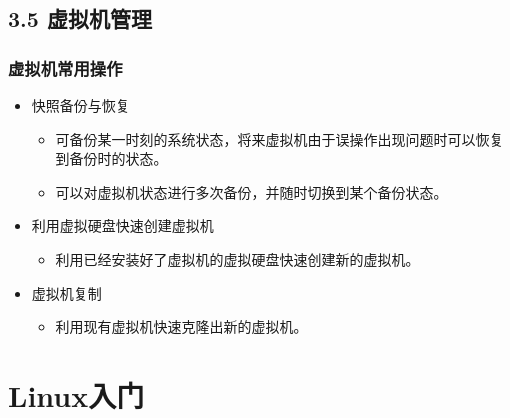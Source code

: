 \documentclass[xcolor=svgnames,bigger,presentation]{beamer}
\begin{document}
\subsection{3.5 虚拟机管理}
\label{sec-3-5}
\begin{frame}
\frametitle{虚拟机常用操作}
\label{sec-3-5-1}
\begin{itemize}

\item 快照备份与恢复
\label{sec-3-5-1-1}%
\begin{itemize}

\item 可备份某一时刻的系统状态，将来虚拟机由于误操作出现问题时可以恢复到备份时的状态。
\label{sec-3-5-1-1-1}%

\item 可以对虚拟机状态进行多次备份，并随时切换到某个备份状态。
\label{sec-3-5-1-1-2}%
\end{itemize} %

\item 利用虚拟硬盘快速创建虚拟机
\label{sec-3-5-1-2}%
\begin{itemize}

\item 利用已经安装好了虚拟机的虚拟硬盘快速创建新的虚拟机。
\label{sec-3-5-1-2-1}%
\end{itemize} %

\item 虚拟机复制
\label{sec-3-5-1-3}%
\begin{itemize}

\item 利用现有虚拟机快速克隆出新的虚拟机。
\label{sec-3-5-1-3-1}%
\end{itemize} %
\end{itemize} %
\end{frame}
\section{Linux入门}
\label{sec-4}
\end{document}
